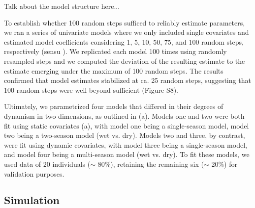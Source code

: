 \documentclass[abstract=on,10pt,a4paper,bibliography=totocnumbered]{article}
\begin{document}
Talk about the model structure here...

To establish whether 100 random steps sufficed to reliably estimate parameters,
we ran a series of univariate models where we only included single covariates
and estimated model coefficients considering 1, 5, 10, 50, 75, and 100 random
steps, respectively (sensu \citealp{Fieberg.2021}). We replicated each model 100
times using randomly resampled steps and we computed the deviation of the
resulting estimate to the estimate emerging under the maximum of 100 random
steps. The results confirmed that model estimates stabilized at ca. 25 random
steps, suggesting that 100 random steps were well beyond sufficient (Figure S8).

Ultimately, we parametrized four models that differed in their degrees of
dynamism in two dimensions, as outlined in (a). Models
one and two were both fit using static covariates (a),
with model one being a single-season model, model two being a two-season model
(wet vs. dry). Models two and three, by contrast, were fit using dynamic
covariates, with model three being a single-season model, and model four being a
multi-season model (wet vs. dry). To fit these models, we used data of 20
individuals ($\sim$ 80\%), retaining the remaining six ($\sim$ 20\%) for
validation purposes.


\subsection{Simulation}
\end{document}
